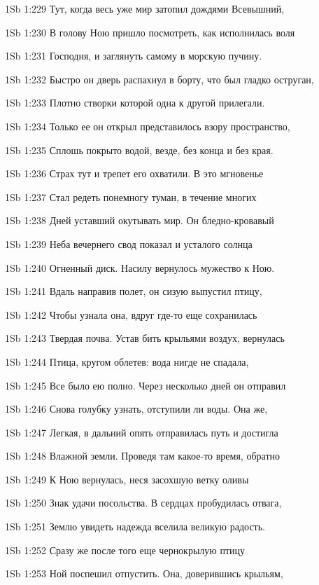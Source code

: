\vs 1Sb 1:229 Тут, когда весь уже мир затопил дождями Всевышний,

\vs 1Sb 1:230 В голову Ною пришло посмотреть, как исполнилась воля

\vs 1Sb 1:231 Господня, и заглянуть самому в морскую пучину.

\vs 1Sb 1:232 Быстро он дверь распахнул в борту, что был гладко оструган,

\vs 1Sb 1:233 Плотно створки которой одна к другой прилегали.

\vs 1Sb 1:234 Только ее он открыл  представилось взору пространство,

\vs 1Sb 1:235 Сплошь покрыто водой, везде, без конца и без края.

\vs 1Sb 1:236 Страх тут и трепет его охватили. В это мгновенье

\vs 1Sb 1:237 Стал редеть понемногу туман, в течение многих

\vs 1Sb 1:238 Дней уставший окутывать мир. Он бледно-кровавый

\vs 1Sb 1:239 Неба вечернего свод показал и усталого солнца

\vs 1Sb 1:240 Огненный диск. Насилу вернулось мужество к Ною.

\vs 1Sb 1:241 Вдаль направив полет, он сизую выпустил птицу,

\vs 1Sb 1:242 Чтобы узнала она, вдруг где-то еще сохранилась

\vs 1Sb 1:243 Твердая почва. Устав бить крыльями воздух, вернулась

\vs 1Sb 1:244 Птица, кругом облетев: вода нигде не спадала,

\vs 1Sb 1:245 Все было ею полно. Через несколько дней он отправил

\vs 1Sb 1:246 Снова голубку узнать, отступили ли воды. Она же,

\vs 1Sb 1:247 Легкая, в дальний опять отправилась путь и достигла

\vs 1Sb 1:248 Влажной земли. Проведя там какое-то время, обратно

\vs 1Sb 1:249 К Ною вернулась, неся засохшую ветку оливы 

\vs 1Sb 1:250 Знак удачи посольства. В сердцах пробудилась отвага,

\vs 1Sb 1:251 Землю увидеть надежда вселила великую радость.

\vs 1Sb 1:252 Сразу же после того еще чернокрылую птицу

\vs 1Sb 1:253 Ной поспешил отпустить. Она, доверившись крыльям,

